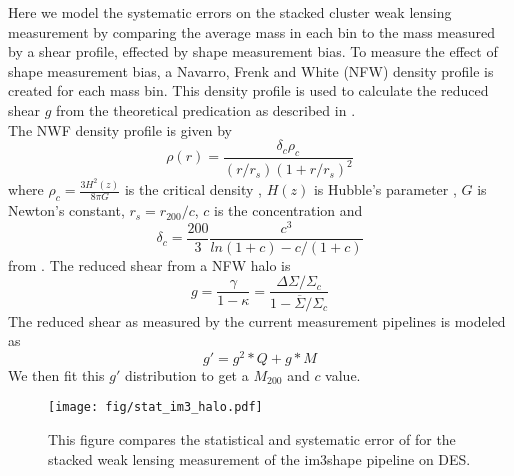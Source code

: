 Here we model the systematic errors on the stacked cluster weak
lensing measurement by comparing the average mass in each bin
to the mass measured by a shear profile, effected by shape 
measurement bias. To measure the effect of shape measurement bias, a Navarro, Frenk and White
(NFW) density profile is created for each mass bin. This density profile is
used to calculate the reduced shear $ g $ from the theoretical
predication as described in \cite{NFW}. \\
\indent The NWF density profile is given by
\begin{equation}
\rho(r) = \frac{\delta_c\rho_c}{(r/r_s)(1+ r/r_s)^{2}}
\end{equation}
where $\rho_c = \frac{3 H^2 (z) }{8 \pi G} $ is the critical density , $
H(z) $ is Hubble's parameter , $G$ is Newton's constant, $r_s =
r_{200}/c$, $c$ is the concentration and 
\begin{equation}
\delta_c = \frac{200}{3}\frac{c^3}{ln(1+c) - c/(1+c)}
\end{equation}
from \citep{NFW} . The reduced shear from a NFW
halo is 
\begin{equation}
g = \frac{\gamma}{1-\kappa} = \frac{ \Delta \Sigma / \Sigma_c }{1
-\overline{\Sigma}/ \Sigma_c}
\end{equation}
The reduced shear as measured by the current measurement pipelines is modeled as 
\begin{equation}
g' = g^2*Q + g*M
\end{equation}
We then fit this $ g' $ distribution to get a $M_{200}$ and $ c $
value. \\
\begin{figure}
\centering
\texttt{[image: fig/stat\_im3\_halo.pdf]} 
\caption{This figure compares the statistical and systematic error of
  for the stacked weak lensing measurement of the im3shape pipeline
  on DES.}
\label{fig:QMC_main_sel}
\end{figure}
